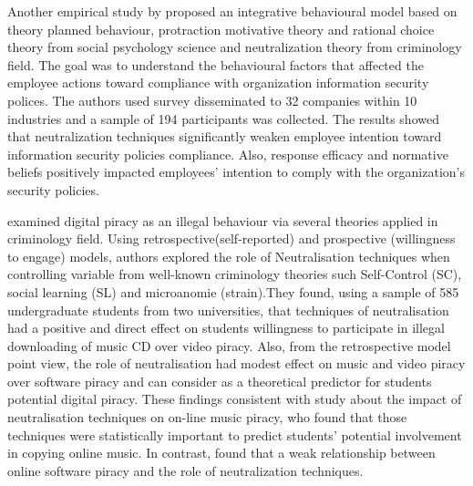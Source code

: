 Another empirical study by\citet{Kim2014} proposed an integrative behavioural model based on theory planned behaviour, protraction motivative theory and rational choice theory from social psychology science and neutralization theory from criminology field. The goal was to understand the behavioural factors that affected the employee actions toward compliance with organization information security polices. The authors used survey disseminated to 32 companies within 10 industries and a sample of 194 participants was collected. The results showed that neutralization techniques significantly weaken employee intention toward information security policies compliance. Also, response efficacy and normative beliefs positively impacted employees' intention to comply with the organization's security policies.

\citet{Morris} examined digital piracy as an illegal behaviour via several theories applied in criminology field. Using retrospective(self-reported) and prospective (willingness to engage) models, authors explored the role of Neutralisation techniques when controlling variable from  well-known criminology theories such Self-Control (SC), social learning (SL) and microanomie (strain).They found, using a sample of 585 undergraduate students from two universities, that techniques of neutralisation had a positive and direct effect on students willingness to participate in illegal downloading of music CD over video piracy. Also, from the retrospective model point view, the role of neutralisation had modest effect on music and video piracy over software piracy and can consider as a theoretical predictor for students potential digital piracy. These findings consistent with \cite{Ingram2008} study about the impact of neutralisation techniques on on-line music piracy, who found that those techniques were statistically important to predict students' potential involvement in copying online music. In contrast, \cite{Hinduja2007} found that a weak relationship between online software piracy and the role of neutralization techniques. 
    
